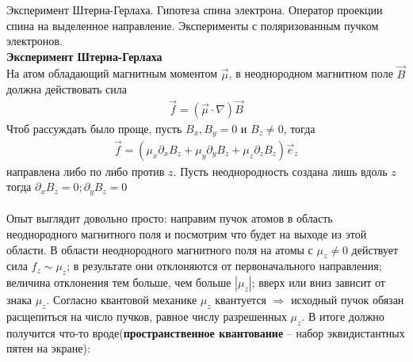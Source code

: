 \documentclass[__main__.tex]{subfiles}
\begin{document}
	
	Эксперимент Штерна-Герлаха. Гипотеза спина электрона. Оператор проекции спина на выделенное направление. Эксперименты с поляризованным пучком электронов.\\ 
	
	\textbf{Эксперимент Штерна-Герлаха}\\
	На атом обладающий магнитным моментом $\vec{\mu}$, в неоднородном магнитном поле $\vec{B}$ должна действовать сила
	\begin{gather*}
		\vec{f} = \left(\vec{\mu}\cdot\nabla\right)\vec{B}
	\end{gather*}
	Чтоб рассуждать было проще, пусть $B_x, B_y = 0$  и $B_z \neq 0$, тогда
	\begin{gather*}
		\vec{f} = \left(\mu_x\partial_xB_z+\mu_y\partial_yB_z+\mu_z\partial_zB_z\right)\vec{e}_z
	\end{gather*}
	направлена либо по либо против $z$. Пусть неоднородность создана лишь вдоль $z$ тогда $\partial_xB_z=0; \partial_yB_z=0$\\\\
	Опыт выглядит довольно просто: направим пучок атомов в область неоднородного магнитного поля и посмотрим что будет на выходе из этой области.
	В области неоднородного магнитного поля на атомы с $\mu_z \neq 0$ действует сила $f_z \sim \mu_z$; в результате они отклоняются от первоначального направления; величина отклонения тем больше, чем больше $|\mu_z|$; вверх или вниз зависит от знака $\mu_z$.
	Согласно квантовой механике $\mu_z$ квантуется $\Rightarrow$ исходный пучок обязан расщепиться на число пучков, равное числу разрешенных $\mu_z$. В итоге должно получится что-то вроде(\textbf{пространственное квантование} -- набор эквидистантных пятен на экране):
	\begin{figure}[h]
		\center{\texttt{[image: ch-18]}}
	\end{figure}
\end{document}
